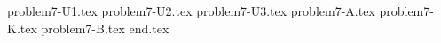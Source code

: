 \documentclass{../../../../style/mkimain}
\begin{document}
{problem7-U1.tex}
{problem7-U2.tex}
{problem7-U3.tex}
{problem7-A.tex}
{problem7-K.tex}
{problem7-B.tex}
{end.tex}
\end{document}
